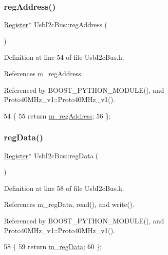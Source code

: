 \subsubsection{\texorpdfstring{reg\+Address()}{regAddress()}}
{\footnotesize\ttfamily \hyperlink{classRegister}{Register}$\ast$ Usb\+I2c\+Bus\+::reg\+Address (\begin{DoxyParamCaption}{ }\end{DoxyParamCaption})\hspace{0.3cm}{\ttfamily [inline]}}



Definition at line 54 of file Usb\+I2c\+Bus.\+h.



References m\+\_\+reg\+Address.



Referenced by B\+O\+O\+S\+T\+\_\+\+P\+Y\+T\+H\+O\+N\+\_\+\+M\+O\+D\+U\+L\+E(), and Proto40\+M\+Hz\+\_\+v1\+::\+Proto40\+M\+Hz\+\_\+v1().


\begin{DoxyCode}
54                          \{
55     \textcolor{keywordflow}{return} \hyperlink{classUsbI2cBus_ad109ed1599f94c84fb4469be8f0d174e}{m\_regAddress};
56   \};
\end{DoxyCode}
\mbox{\label{classUsbI2cBus_adbd9f85503b361a5b170df2c6c1e733b}} 
\subsubsection{\texorpdfstring{reg\+Data()}{regData()}}
{\footnotesize\ttfamily \hyperlink{classRegister}{Register}$\ast$ Usb\+I2c\+Bus\+::reg\+Data (\begin{DoxyParamCaption}{ }\end{DoxyParamCaption})\hspace{0.3cm}{\ttfamily [inline]}}



Definition at line 58 of file Usb\+I2c\+Bus.\+h.



References m\+\_\+reg\+Data, read(), and write().



Referenced by B\+O\+O\+S\+T\+\_\+\+P\+Y\+T\+H\+O\+N\+\_\+\+M\+O\+D\+U\+L\+E(), and Proto40\+M\+Hz\+\_\+v1\+::\+Proto40\+M\+Hz\+\_\+v1().


\begin{DoxyCode}
58                       \{
59     \textcolor{keywordflow}{return} \hyperlink{classUsbI2cBus_afce60d99fce3a99d0d7d59d43a2f7ba5}{m\_regData};
60   \};
\end{DoxyCode}
\mbox{\label{classUsbI2cBus_a4063433fd349fff112f4e2ceb3d35072}} 
